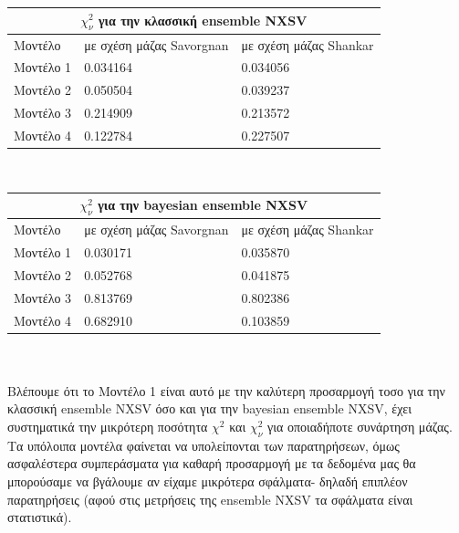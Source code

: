  

\begin{tabular}{ |p{3cm}||p{4.5cm}|p{4.5cm}|  }
 \hline
 \multicolumn{3}{|c|}{$\chi_\nu^2$ για την κλασσική \textlatin{ensemble NXSV}} \\
 \hline
 Μοντέλο & με σχέση μάζας \textlatin{Savorgnan} & με σχέση μάζας \textlatin{Shankar}\\
 \hline
 Μοντέλο 1 &  0.034164 & 0.034056\\
 Μοντέλο 2 & 0.050504 & 0.039237\\
 Μοντέλο 3 &  0.214909 & 0.213572\\
 Μοντέλο 4 & 0.122784 & 0.227507\\
 \hline
\end{tabular}\\

\begin{tabular}{ |p{3cm}||p{4.5cm}|p{4.5cm}|  }
 \hline
 \multicolumn{3}{|c|}{$\chi_\nu^2$ για την \textlatin{bayesian ensemble NXSV}} \\
 \hline
 Μοντέλο & με σχέση μάζας \textlatin{Savorgnan} & με σχέση μάζας \textlatin{Shankar}\\
 \hline
 Μοντέλο 1 &  0.030171 & 0.035870\\
 Μοντέλο 2 & 0.052768 & 0.041875\\
 Μοντέλο 3 &  0.813769 & 0.802386\\
 Μοντέλο 4 & 0.682910 & 0.103859\\
 \hline
\end{tabular}\\ \\

Βλέπουμε ότι το Μοντέλο 1 είναι αυτό με την καλύτερη προσαρμογή τοσο για την κλασσική \textlatin{ensemble NXSV} όσο και για την \textlatin{bayesian ensemble NXSV}, έχει συστηματικά την μικρότερη ποσότητα $\chi^2$ και $\chi_\nu^2$ για οποιαδήποτε συνάρτηση μάζας.\\
Τα υπόλοιπα μοντέλα φαίνεται να υπολείπονται των παρατηρήσεων, όμως ασφαλέστερα συμπεράσματα για καθαρή προσαρμογή με τα δεδομένα μας θα μπορούσαμε να βγάλουμε αν είχαμε μικρότερα σφάλματα- δηλαδή επιπλέον παρατηρήσεις (αφού στις μετρήσεις της \textlatin{ensemble NXSV} τα σφάλματα είναι στατιστικά).

